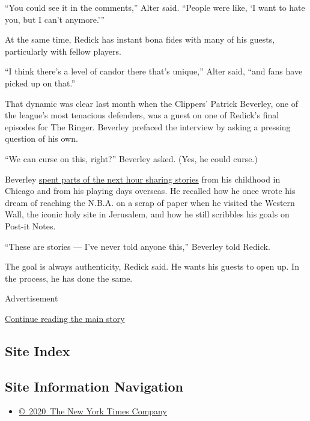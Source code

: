 ``You could see it in the comments,'' Alter said. ``People were like, `I
want to hate you, but I can't anymore.'''

At the same time, Redick has instant bona fides with many of his guests,
particularly with fellow players.

``I think there's a level of candor there that's unique,'' Alter said,
``and fans have picked up on that.''

That dynamic was clear last month when the Clippers' Patrick Beverley,
one of the league's most tenacious defenders, was a guest on one of
Redick's final episodes for The Ringer. Beverley prefaced the interview
by asking a pressing question of his own.

``We can curse on this, right?'' Beverley asked. (Yes, he could curse.)

Beverley
\href{https://www.theringer.com/2020/7/16/21327810/patrick-beverley-on-doubt-setting-goals-and-developing-his-game}{spent
parts of the next hour sharing stories} from his childhood in Chicago
and from his playing days overseas. He recalled how he once wrote his
dream of reaching the N.B.A. on a scrap of paper when he visited the
Western Wall, the iconic holy site in Jerusalem, and how he still
scribbles his goals on Post-it Notes.

``These are stories --- I've never told anyone this,'' Beverley told
Redick.

The goal is always authenticity, Redick said. He wants his guests to
open up. In the process, he has done the same.

Advertisement

\protect\hyperlink{after-bottom}{Continue reading the main story}

\hypertarget{site-index}{%
\subsection{Site Index}\label{site-index}}

\hypertarget{site-information-navigation}{%
\subsection{Site Information
Navigation}\label{site-information-navigation}}

\begin{itemize}
\tightlist
\item
  \href{https://help.nytimes.com/hc/en-us/articles/115014792127-Copyright-notice}{©~2020~The
  New York Times Company}
\end{itemize}

